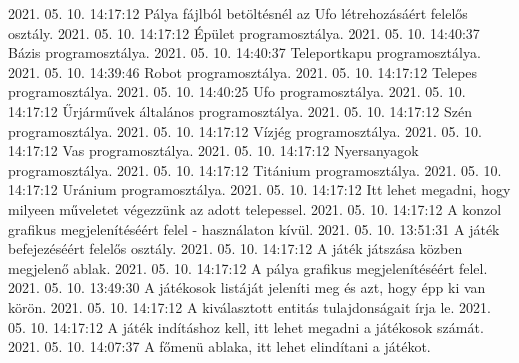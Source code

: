  {2021. 05. 10. 14:17:12} {Pálya fájlból betöltésnél az Ufo létrehozásáért felelős osztály.}
 {2021. 05. 10. 14:17:12} {Épület programosztálya.}
 {2021. 05. 10. 14:40:37} {Bázis programosztálya.}
 {2021. 05. 10. 14:40:37} {Teleportkapu programosztálya.}
 {2021. 05. 10. 14:39:46} {Robot programosztálya.}
 {2021. 05. 10. 14:17:12} {Telepes programosztálya.}
 {2021. 05. 10. 14:40:25} {Ufo programosztálya.}
 {2021. 05. 10. 14:17:12} {Űrjárművek általános programosztálya.}
 {2021. 05. 10. 14:17:12} {Szén programosztálya.}
 {2021. 05. 10. 14:17:12} {Vízjég programosztálya.}
 {2021. 05. 10. 14:17:12} {Vas programosztálya.}
 {2021. 05. 10. 14:17:12} {Nyersanyagok programosztálya.}
 {2021. 05. 10. 14:17:12} {Titánium programosztálya.}
 {2021. 05. 10. 14:17:12} {Uránium programosztálya.}
 {2021. 05. 10. 14:17:12} {Itt lehet megadni, hogy milyeen műveletet végezzünk az adott telepessel.}
 {2021. 05. 10. 14:17:12} {A konzol grafikus megjelenítéséért felel - használaton kívül.}
 {2021. 05. 10. 13:51:31} {A játék befejezéséért felelős osztály.}
 {2021. 05. 10. 14:17:12} {A játék játszása közben megjelenő ablak.}
 {2021. 05. 10. 14:17:12} {A pálya grafikus megjelenítéséért felel.}
 {2021. 05. 10. 13:49:30} {A játékosok listáját jeleníti meg és azt, hogy épp ki van körön.}
 {2021. 05. 10. 14:17:12} {A kiválasztott entitás tulajdonságait írja le.}
 {2021. 05. 10. 14:17:12} {A játék indításhoz kell, itt lehet megadni a játékosok számát.}
 {2021. 05. 10. 14:07:37} {A főmenü ablaka, itt lehet elindítani a játékot.}
